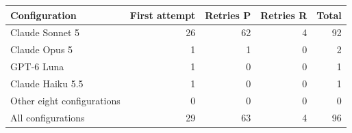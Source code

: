 \begin{tabular}{lrrrr}
\toprule
Configuration & First attempt & Retries P & Retries R & Total \\
\midrule
Claude Sonnet 5 & 26 & 62 & 4 & 92 \\
Claude Opus 5 & 1 & 1 & 0 & 2 \\
GPT-6 Luna & 1 & 0 & 0 & 1 \\
Claude Haiku 5.5 & 1 & 0 & 0 & 1 \\
Other eight configurations & 0 & 0 & 0 & 0 \\
\midrule
All configurations & 29 & 63 & 4 & 96 \\
\bottomrule
\end{tabular}

